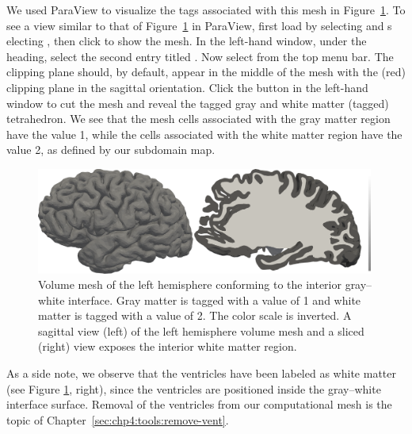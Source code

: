 We used ParaView to visualize the tags associated with this mesh
in Figure~\ref{fig:chp4:ernie-tagged-twodomain-mesh}.  To see a view similar 
to that of Figure~\ref{fig:chp4:ernie-tagged-twodomain-mesh} in ParaView, first 
load  by selecting  and s
electing , then click  to show the mesh.  In 
the left-hand window, under the  heading, select the second 
entry titled .  Now select 
 from the top menu 
bar.  The clipping plane should, by default, appear in the middle of the mesh 
with the (red) clipping plane in the sagittal orientation.  Click the 
 button in the left-hand window to cut the mesh and reveal the 
tagged gray and white matter (tagged) tetrahedron.  We see that the
mesh cells associated with the gray matter region have the value 1,
while the cells associated with the white matter region have the value
2, as defined by our subdomain map.

\begin{figure}
  \includegraphics[width=0.99\textwidth]{./graphics/chp4/two-domain-tagged-bw.png}
  \caption{Volume mesh of the left hemisphere conforming to the
    interior gray--white interface.  Gray matter is tagged with a value of 1 
    and white matter is tagged with a value of 2.  The color scale is inverted. 
    A sagittal view (left) of the left hemisphere volume mesh and a sliced 
    (right) view exposes the interior white matter region.}
  \label{fig:chp4:ernie-tagged-twodomain-mesh}
\end{figure}

As a side note, we observe that the ventricles have been labeled as
white matter (see Figure \ref{fig:chp4:ernie-tagged-twodomain-mesh},
right), since the ventricles are positioned inside the gray--white
interface surface. Removal of the ventricles from our computational mesh
is the topic of Chapter~\ref{sec:chp4:tools:remove-vent}.

